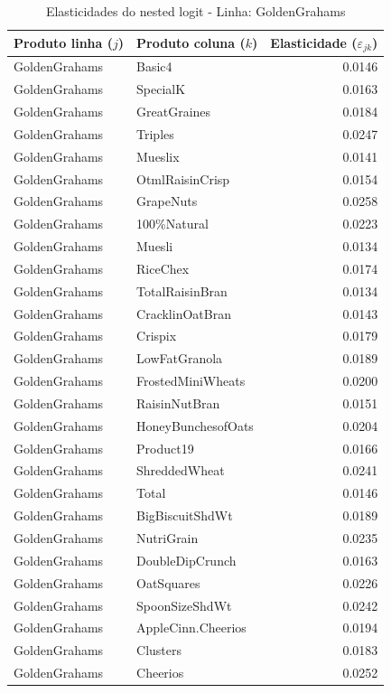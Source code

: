\begingroup
\begin{table}[H]
\centering
\caption{Elasticidades do nested logit - Linha: GoldenGrahams}
\label{tab:elas-nested-goldengrahams}
\small
\begin{tabular}{llr}
\toprule
Produto linha ($j$) & Produto coluna ($k$) & Elasticidade ($\varepsilon_{jk}$) \\
\midrule
GoldenGrahams & Basic4 & 0.0146 \\
GoldenGrahams & SpecialK & 0.0163 \\
GoldenGrahams & GreatGraines & 0.0184 \\
GoldenGrahams & Triples & 0.0247 \\
GoldenGrahams & Mueslix & 0.0141 \\
GoldenGrahams & OtmlRaisinCrisp & 0.0154 \\
GoldenGrahams & GrapeNuts & 0.0258 \\
GoldenGrahams & 100\%Natural & 0.0223 \\
GoldenGrahams & Muesli & 0.0134 \\
GoldenGrahams & RiceChex & 0.0174 \\
GoldenGrahams & TotalRaisinBran & 0.0134 \\
GoldenGrahams & CracklinOatBran & 0.0143 \\
GoldenGrahams & Crispix & 0.0179 \\
GoldenGrahams & LowFatGranola & 0.0189 \\
GoldenGrahams & FrostedMiniWheats & 0.0200 \\
GoldenGrahams & RaisinNutBran & 0.0151 \\
GoldenGrahams & HoneyBunchesofOats & 0.0204 \\
GoldenGrahams & Product19 & 0.0166 \\
GoldenGrahams & ShreddedWheat & 0.0241 \\
GoldenGrahams & Total & 0.0146 \\
GoldenGrahams & BigBiscuitShdWt & 0.0189 \\
GoldenGrahams & NutriGrain & 0.0235 \\
GoldenGrahams & DoubleDipCrunch & 0.0163 \\
GoldenGrahams & OatSquares & 0.0226 \\
GoldenGrahams & SpoonSizeShdWt & 0.0242 \\
GoldenGrahams & AppleCinn.Cheerios & 0.0194 \\
GoldenGrahams & Clusters & 0.0183 \\
GoldenGrahams & Cheerios & 0.0252 \\

\end{tabular}
\end{table}

